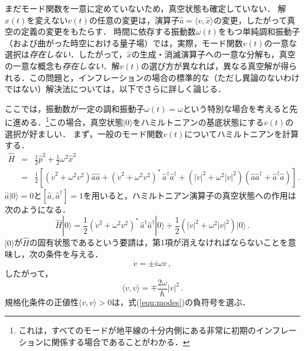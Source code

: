 
まだモード関数を一意に定めていないため，真空状態も確定していない．
解$x(t)$を変えない$v(t)$の任意の変更は，演算子$\hat{a} = \langle v, \hat{x}\rangle$の変更，したがって真空の定義の変更をもたらす．
時間に依存する振動数$\omega(t)$をもつ単純調和振動子（および曲がった時空における量子場）では，実際，モード関数$v(t)$の一意な選択は{\it 存在しない}．したがって，$\hat{x}$の生成・消滅演算子への一意な分解も，真空の一意な概念も{\it 存在しない}．解$v(t)$の選び方が異なれば，異なる真空解が得られる．この問題と，インフレーションの場合の標準的な（ただし異論のないわけではない）解決法については，以下でさらに詳しく論じる．


\vskip 6pt
ここでは，振動数が一定の調和振動子$\omega(t) =\omega$という特別な場合を考えると先に進める．\footnote{これは，すべてのモードが地平線の十分内側にある非常に初期のインフレーションに関係する場合であることがわかる．}この場合，真空状態$|0\rangle$をハミルトニアンの基底状態にする$v(t)$の選択が好ましい．
まず，一般のモード関数$v(t)$についてハミルトニアンを計算する．
\begin{eqnarray}
\hat{H} &=& \frac{1}{2} \hat{p}^2 +\frac{1}{2} \omega^2 \hat{x}^2 \\
&=& \frac{1}{2} \left[(\dot{v}^2 + \omega^2 v^2) \hat{a} \hat{a}  + (\dot{v}^2 + \omega^2 v^2)^* \, \hat{a}^\dagger \hat{a}^\dagger +(|\dot{v}|^2 +\omega^2 |v|^2) (\hat{a}\hat{a}^\dagger + \hat{a}^\dagger \hat{a})\right]\nonumber\, .
\end{eqnarray} 
$\hat{a} |0\rangle =0$と$[\hat{a},\hat{a}^\dagger]=1$を用いると，ハミルトニアン演算子の真空状態への作用は次のようになる．
\begin{equation}
\hat{H} |0 \rangle = \frac{1}{2} (\dot{v}^2 + \omega^2 v^2)^*\, \hat{a}^\dagger \hat{a}^\dagger |0 \rangle + \frac{1}{2}(|\dot{v}|^2 +\omega^2 |v|^2) |0 \rangle\, . 
\end{equation}
$|0\rangle$が$\hat{H}$の固有状態であるという要請は，第1項が消えなければならないことを意味し，次の条件を与える．
\begin{equation}
\label{equ:modes}
\dot{v} = \pm i \omega v\, ,
\end{equation}
したがって，
\begin{equation}
\langle v, v \rangle = \mp \frac{2 \omega}{\hbar} |v|^2\, .
\end{equation}
規格化条件の正値性$\langle v, v \rangle > 0$は，式(\ref{equ:modes})の負符号を選ぶ．
